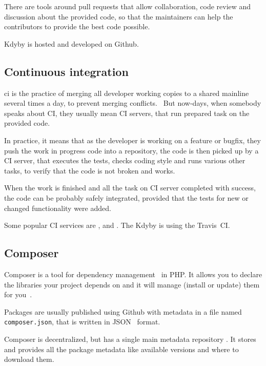 There are tools around pull requests that allow collaboration, code review and discussion about the provided code, so that the maintainers can help the contributors to provide the best code possible.

Kdyby is hosted and developed on Github.

\subsection{Continuous integration} \label{sec:theory:ci}

\gls{ci} is the practice of merging all developer working copies to a shared mainline several times a day, to prevent merging conflicts.~\cite{wiki:ci} But now-days, when somebody speaks about CI, they usually mean CI servers, that run prepared task on the provided code.

In practice, it means that as the developer is working on a feature or bugfix, they push the work in progress code into a repository, the code is then picked up by a CI server, that executes the tests, checks coding style and runs various other tasks, to verify that the code is not broken and works.

When the work is finished and all the task on CI server completed with success, the code can be probably safely integrated, provided that the tests for new or changed functionality were added.

Some popular CI services are ,  and . The Kdyby is using the Travis~CI.

\subsection{Composer} \label{sec:theory:composer}

Composer is a tool for dependency management~\cite{wiki:package-manager} in PHP. It allows you to declare the libraries your project depends on and it will manage (install or update) them for you~\cite{composer:docs:intro}.

Packages are usually published using Github with metadata in a file named \lstinline{composer.json}, that is written in JSON~\cite{wiki:json} format.

Composer is decentralized, but has a single main metadata repository . It stores and provides all the package metadata like available versions and where to download them.

